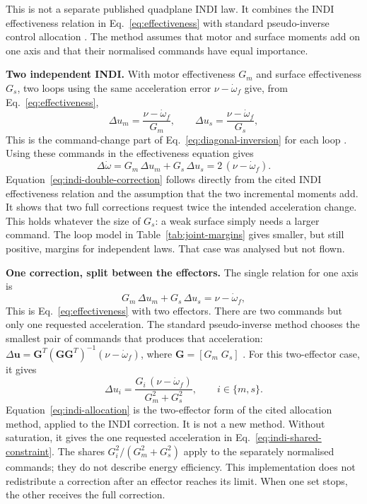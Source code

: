 \documentclass{article}
\begin{document}
This is not a separate published quadplane INDI law. It combines the INDI effectiveness relation in Eq.~\eqref{eq:effectiveness} \citep{bacon2000,steinertPart1_2025} with standard pseudo-inverse control allocation \citep{johansenfossen2013}. The method assumes that motor and surface moments add on one axis and that their normalised commands have equal importance.

\textbf{Two independent INDI.} With motor effectiveness $G_m$ and surface effectiveness $G_s$, two loops using the same acceleration error $\nu-\dot\omega_f$ give, from Eq.~\eqref{eq:effectiveness},
\begin{equation}
    \Delta u_m = \frac{\nu-\dot\omega_f}{G_m}, \qquad \Delta u_s = \frac{\nu-\dot\omega_f}{G_s},
    \label{eq:indi-independent-increments}
\end{equation}
This is the command-change part of Eq.~\eqref{eq:diagonal-inversion} for each loop \citep{bacon2000,steinertPart1_2025}. Using these commands in the effectiveness equation gives
\begin{equation}
    \Delta\dot\omega = G_m\,\Delta u_m + G_s\,\Delta u_s = 2\,(\nu-\dot\omega_f).
    \label{eq:indi-double-correction}
\end{equation}
Equation~\eqref{eq:indi-double-correction} follows directly from the cited INDI effectiveness relation and the assumption that the two incremental moments add. It shows that two full corrections request twice the intended acceleration change. This holds whatever the size of $G_s$: a weak surface simply needs a larger command. The loop model in Table~\ref{tab:joint-margins} gives smaller, but still positive, margins for independent laws. That case was analysed but not flown.

\textbf{One correction, split between the effectors.} The single relation for one axis is
\begin{equation}
    G_m\,\Delta u_m + G_s\,\Delta u_s = \nu-\dot\omega_f ,
    \label{eq:indi-shared-constraint}
\end{equation}
This is Eq.~\eqref{eq:effectiveness} with two effectors. There are two commands but only one requested acceleration. The standard pseudo-inverse method chooses the smallest pair of commands that produces that acceleration: $\Delta\mathbf{u}=\mathbf{G}^{T}(\mathbf{G}\mathbf{G}^{T})^{-1}(\nu-\dot\omega_f)$, where $\mathbf{G}=[G_m\;G_s]$ \citep{johansenfossen2013}. For this two-effector case, it gives
\begin{equation}
    \Delta u_i = \frac{G_i\,(\nu-\dot\omega_f)}{G_m^2+G_s^2}, \qquad i\in\{m,s\}.
    \label{eq:indi-allocation}
\end{equation}
Equation~\eqref{eq:indi-allocation} is the two-effector form of the cited allocation method, applied to the INDI correction. It is not a new method. Without saturation, it gives the one requested acceleration in Eq.~\eqref{eq:indi-shared-constraint}. The shares $G_i^2/(G_m^2+G_s^2)$ apply to the separately normalised commands; they do not describe energy efficiency. This implementation does not redistribute a correction after an effector reaches its limit. When one set stops, the other receives the full correction.
\end{document}
